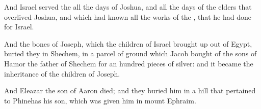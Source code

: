 \verse And Israel served the \LORD all the days of Joshua, and all the days of the elders that overlived Joshua, and which had known all the works of the \LORD, that he had done for Israel.

\verse And the bones of Joseph, which the children of Israel brought up out of Egypt, buried they in Shechem, in a parcel of ground which Jacob bought of the sons of Hamor the father of Shechem for an hundred pieces of silver: and it became the inheritance of the children of Joseph.

\verse And Eleazar the son of Aaron died; and they buried him in a hill that pertained to Phinehas his son, which was given him in mount Ephraim.

